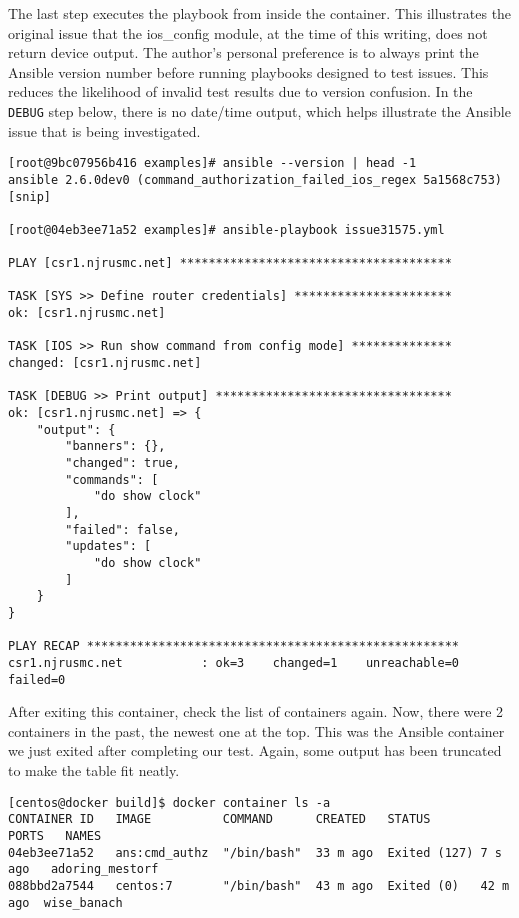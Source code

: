The last step executes the playbook from inside the container. This
illustrates the original issue that the ios\_config module, at the time of this
writing, does not return device output. The author's personal preference is to
always print the Ansible version number before running playbooks designed to
test issues. This reduces the likelihood of invalid test results due to
version confusion. In the \verb|DEBUG| step below, there is no date/time
output, which helps illustrate the Ansible issue that is being investigated.

\begin{verbatim}
[root@9bc07956b416 examples]# ansible --version | head -1
ansible 2.6.0dev0 (command_authorization_failed_ios_regex 5a1568c753) [snip]

[root@04eb3ee71a52 examples]# ansible-playbook issue31575.yml 

PLAY [csr1.njrusmc.net] **************************************

TASK [SYS >> Define router credentials] **********************
ok: [csr1.njrusmc.net]

TASK [IOS >> Run show command from config mode] **************
changed: [csr1.njrusmc.net]

TASK [DEBUG >> Print output] *********************************
ok: [csr1.njrusmc.net] => {
    "output": {
        "banners": {}, 
        "changed": true, 
        "commands": [
            "do show clock"
        ], 
        "failed": false, 
        "updates": [
            "do show clock"
        ]
    }
}

PLAY RECAP ****************************************************
csr1.njrusmc.net           : ok=3    changed=1    unreachable=0    failed=0   
\end{verbatim}

After exiting this container, check the list of containers again. Now, there
were 2 containers in the past, the newest one at the top. This was the Ansible
container we just exited after completing our test. Again, some output has
been truncated to make the table fit neatly.

\begin{verbatim}
[centos@docker build]$ docker container ls -a
CONTAINER ID   IMAGE          COMMAND      CREATED   STATUS         PORTS   NAMES
04eb3ee71a52   ans:cmd_authz  "/bin/bash"  33 m ago  Exited (127) 7 s ago   adoring_mestorf
088bbd2a7544   centos:7       "/bin/bash"  43 m ago  Exited (0)   42 m ago  wise_banach
\end{verbatim}

